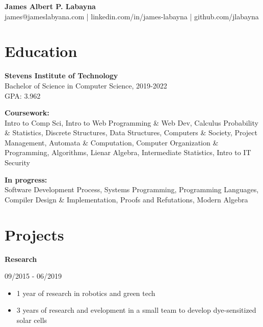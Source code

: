 \documentclass[11pt,letterpaper]{article}
\begin{document}
  \begin{center}
    \textbf{James Albert P. Labayna} \\
    \small james@jameslabyana.com | linkedin.com/in/james-labayna | github.com/jlabayna
  \end{center}
  
  \iffalse
  \begin{minipage}[t]{2in}
    \textbf{Present Address:} \\
    205 Hudson St, Apt. 602 \\
    Hoboken, NJ 07030 \\
    201.256.7526
  \end{minipage}
  \hfill
  \begin{minipage}[t]{2.4in}
    \textbf{Permanent Address:} \\
    294 S. Washington Ave., Apt. 87 \\
    Bergenfield, NJ 07030
  \end{minipage}
  \fi
  
  \section{Education}
    \textbf{Stevens Institute of Technology} \\
    Bachelor of Science in Computer Science, 2019-2022 \\
    GPA: 3.962
    
    \noindent\textbf{Coursework:}\\
    Intro to Comp Sci, Intro to Web Programming \& Web Dev, Calculus Probability \& Statistics, Discrete Structures, Data Structures, Computers \& Society, Project Management, 
    Automata \& Computation, Computer Organization \& Programming, Algorithms, Lienar Algebra, Intermediate Statistics, Intro to IT Security

    \textbf{In progress:}\\
	Software Development Process, Systems Programming, Programming Languages, Compiler Design \& Implementation, Proofs and Refutations, Modern Algebra

  \section{Projects}
    \textbf{Research}\hfill
    \begin{minipage}[t]{1.2in}
      09/2015 - 06/2019
    \end{minipage}
    
      \begin{itemize}
        \item 1 year of research in robotics and green tech
        \item 3 years of research and evelopment in a small team to develop dye-sensitized solar cells
      \end{itemize}
    
\end{document}
